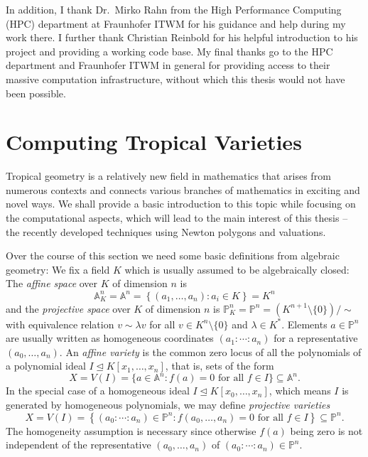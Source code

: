 \documentclass[
  paper=a4,
  titlepage,
  bibliography=totoc,
  pagesize=pdftex
]{scrartcl}
\numberwithin{figure}{section}
\numberwithin{equation}{section}
\numberwithin{table}{section}
\newcommand*\setA{\mathds{A}}
\newcommand*\setP{\mathds{P}}
\let\idealof\trianglelefteq
\theoremstyle{definition}
\numberwithin{definition}{section}
\begin{document}
In addition, I thank Dr.~Mirko Rahn from the High Performance Computing (HPC) department
at Fraunhofer ITWM for his guidance and help during my work there. I further thank
Christian Reinbold for his helpful introduction to his project and providing a working
code base. My final thanks go to the HPC department and Fraunhofer ITWM in general for
providing access to their massive computation infrastructure, without which this thesis
would not have been possible.

\section{Computing Tropical Varieties}
\label{sec:theory}

Tropical geometry is a relatively new field in mathematics that arises from numerous
contexts and connects various branches of mathematics in exciting and novel ways. We shall
provide a basic introduction to this topic while focusing on the computational aspects,
which will lead to the main interest of this thesis -- the recently developed techniques
using Newton polygons and valuations.

Over the course of this section we need some basic definitions from algebraic geometry: We
fix a field $K$ which is usually assumed to be algebraically closed: The \emph{affine
space} over $K$ of dimension $n$ is
\[
  \setA_K^n = \setA^n = \left\{ (a_1,\dots,a_n) : a_i \in K\right\} = K^n
\]
and the \emph{projective space} over $K$ of dimension $n$ is $\setP^n_K = \setP^n =
(K^{n+1}\setminus\{0\})/\sim$ with equivalence relation $v \sim \lambda v$ for all $v \in
K^n\setminus \{0\}$ and $\lambda \in K^*$. Elements $a \in \setP^n$ are usually written as
homogeneous coordinates $(a_1:\cdots:a_n)$ for a representative $(a_0, \dots, a_n)$. An
\emph{affine variety} is the common zero locus of all the polynomials of a polynomial
ideal $I \idealof K[x_1, \dots, x_n]$, that is, sets of the form
\[
  X = V(I) = \{ a \in \setA^n : f(a) = 0 \text{ for all $f\in I$} \} \subseteq \setA^n.
\]
In the special case of a homogeneous ideal $I \idealof K[x_0,\dots,x_n]$, which means $I$
is generated by homogeneous polynomials, we may define \emph{projective varieties}
\[
  X = V(I) = \left\{ (a_0:\cdots:a_n) \in \setP^n : f(a_0, \dots, a_n) = 0
    \text{ for all $f \in I$}
  \right\} \subseteq \setP^n.
\]
The homogeneity assumption is necessary since otherwise $f(a)$ being zero is not
independent of the representative $(a_0,\dots,a_n)$ of $(a_0:\cdots:a_n)\in \setP^n$.
\end{document}
